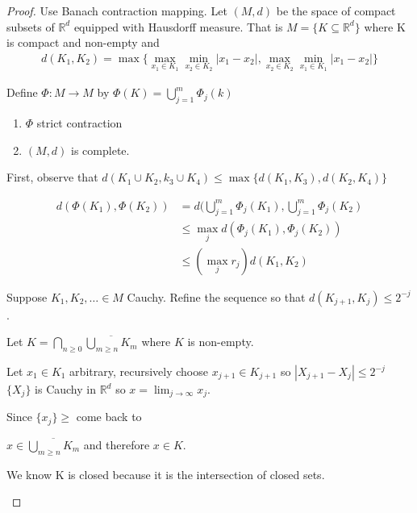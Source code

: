 \begin{proof}
	Use Banach contraction mapping. Let $(M,d)$ be the space of compact subsets of $\mathbb{R}^d$ equipped with Hausdorff measure.
	That is $M = \{K \subseteq \mathbb{R}^d\}$ where K is compact and non-empty
	and
	\begin{align*}
		d(K_1, K_2) = \max\{ \max_{x_1 \in K_1} \min_{x_2 \in K_2} |x_1 - x_2|, \max_{x_2 \in K_2} \min_{x_1 \in K_1} |x_1 - x_2| \}
	\end{align*}

	Define $\Phi : M \to M$ by  $\Phi (K) = \bigcup_{j=1}^{m} \Phi_j (k)$
	\begin{claim}
		\begin{enumerate}
			\item $\Phi$ strict contraction
			\item $(M,d)$ is complete.
		\end{enumerate}
	\end{claim}

	First, observe that $d(K_1 \cup K_2, k_3 \cup K_4) \leq \max\{d(K_1, K_3), d(K_2, K_4)\}$

	\begin{subproof}
		\begin{align*}
			d(\Phi(K_1), \Phi (K_2)) &= d( \bigcup_{j=1}^{m} \Phi_j(K_1),\bigcup_{j=1}^{m} \Phi_j (K_2) \\
									 &\leq \max_{j} d( \Phi_{j}(K_1), \Phi_{j}(K_2)) \\
									 &\leq (\max_{j} r_{j}) d(K_{1}, K_2)
		\end{align*} 
	\end{subproof}
	
	\begin{subproof} 
	  
	Suppose $K_1, K_2, \ldots \in M$ Cauchy. Refine the sequence so that $d(K_{j+1}, K_j ) \leq 2^{-j}$.

		Let $K = \bigcap_{n \geq 0} \overline{\bigcup_{m \geq n} K_m}$ where $K$ is non-empty.

		Let $x_1 \in K_1$ arbitrary, recursively choose $x_{j+1} \in K_{j+1}$ so $|X_{j+1} - X_j | \leq 2^{-j}$
		$\{X_j\}$ is Cauchy in $\mathbb{R}^d$ so $x = \lim_{j \to \infty} x_j$.

		Since $\{x_j\} \geq$ come back to

		$x \in \overline{\bigcup_{m \geq n} K_{m}}$ and therefore $x \in K$.
		
		We know K is closed because it is the intersection of closed sets.
		

\end{subproof}
\end{proof}
